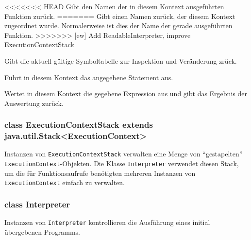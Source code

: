 \begin{description}
<<<<<<< HEAD
    Gibt den Namen der in diesem Kontext ausgeführten Funktion zurück.
=======
    Gibt einen Namen zurück, der diesem Kontext zugeordnet wurde. Normalerweise ist dies der Name der gerade ausgeführten Funktion.
>>>>>>> [ew] Add ReadableInterpreter, improve ExecutionContextStack

    Gibt die aktuell gültige Symboltabelle zur Inspektion und Veränderung zrück.

    Führt in diesem Kontext das angegebene Statement aus.

    Wertet in diesem Kontext die gegebene Expression aus und gibt das Ergebnis der Auswertung zurück.
\end{description}


\subsubsection{class ExecutionContextStack extends java.util.Stack<ExecutionContext>}

Instanzen von \texttt{ExecutionContextStack} verwalten eine Menge von "`gestapelten"' \texttt{ExecutionContext}-Objekten. Die Klasse \texttt{Interpreter} verwendet diesen Stack, um die für Funktionsaufrufe benötigten mehreren Instanzen von \texttt{ExecutionContext} einfach zu verwalten.

\subsubsection{class Interpreter}

Instanzen von \texttt{Interpreter} kontrollieren die Ausführung eines initial übergebenen Programms.

